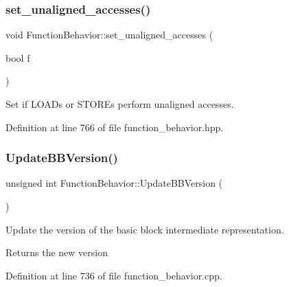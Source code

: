 \mbox{\label{classFunctionBehavior_a50213465442e3966f63833417666d57a}} 
\subsubsection{\texorpdfstring{set\+\_\+unaligned\+\_\+accesses()}{set\_unaligned\_accesses()}}
{\footnotesize\ttfamily void Function\+Behavior\+::set\+\_\+unaligned\+\_\+accesses (\begin{DoxyParamCaption}\item[{bool}]{f }\end{DoxyParamCaption})\hspace{0.3cm}{\ttfamily [inline]}}



Set if L\+O\+A\+Ds or S\+T\+O\+R\+Es perform unaligned accesses. 



Definition at line 766 of file function\+\_\+behavior.\+hpp.

\mbox{\label{classFunctionBehavior_a4e301419c7e8d6b8de50338c2d351f69}} 
\subsubsection{\texorpdfstring{Update\+B\+B\+Version()}{UpdateBBVersion()}}
{\footnotesize\ttfamily unsigned int Function\+Behavior\+::\+Update\+B\+B\+Version (\begin{DoxyParamCaption}{ }\end{DoxyParamCaption})}



Update the version of the basic block intermediate representation. 

\begin{DoxyReturn}{Returns}
the new version 
\end{DoxyReturn}


Definition at line 736 of file function\+\_\+behavior.\+cpp.



